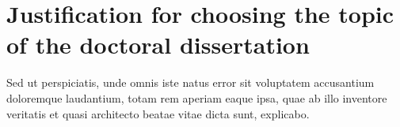 \section{Justification for choosing the topic of the doctoral dissertation}


Sed ut perspiciatis, unde omnis iste natus error sit voluptatem accusantium doloremque laudantium, totam rem aperiam eaque ipsa, quae ab illo inventore veritatis et quasi architecto beatae vitae dicta sunt, explicabo.
